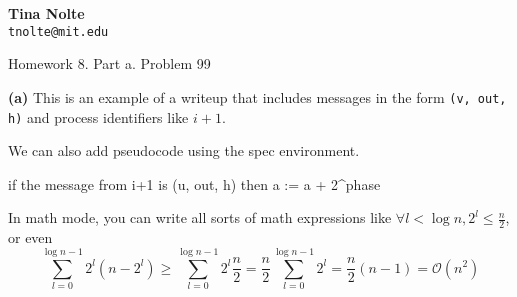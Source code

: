 \documentclass[letter,12pt]{article}
\begin{document}
\begin{flushright}
 {\bf Tina Nolte} \\ {\tt tnolte@mit.edu}
\end{flushright}

\vspace{5mm}

\begin{center}
\Large Homework 8. Part a. Problem 99
\end{center}

\vspace{10mm}


{\bf (a)} This is an example of a writeup that includes messages
in the form {\tt (v, out, h)} and process identifiers like $i+1$.

We can also add pseudocode using the spec environment.

\begin{spec}
if the message from i+1 is (u, out, h) then
   a := a + 2^{phase}
\end{spec}

In math mode, you can write all sorts of math expressions like
$\forall l < \log n, 2^l \le \frac{n}{2}$, or even
\[
	\sum_{l=0}^{\log n - 1} 2^l(n-2^l)
		\ge
	\sum_{l=0}^{\log n - 1} 2^l\frac{n}{2}
		=
	\frac{n}{2}\sum_{l=0}^{\log n - 1} 2^l
		= 
	\frac{n}{2}(n -1) = \mathcal{O}(n^2)
\]
\end{document}
